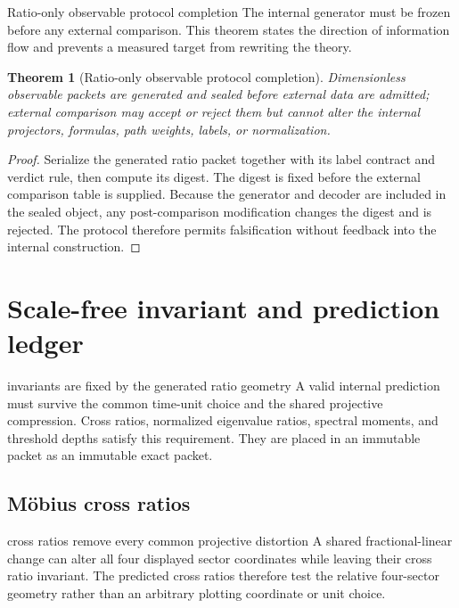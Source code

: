 \documentclass[11pt]{article}
\numberwithin{equation}{section}
\newtheorem{theorem}[definition]{Theorem}
\theoremstyle{remark}
\begin{document}
\begin{proofguide}{Ratio-only observable protocol completion}
The internal generator must be frozen before any external comparison. This theorem states the direction of information flow and prevents a measured target from rewriting the theory.
\end{proofguide}
\begin{theorem}[Ratio-only observable protocol completion]
Dimensionless observable packets are generated and sealed before external data are admitted; external comparison may accept or reject them but cannot alter the internal projectors, formulas, path weights, labels, or normalization.
\end{theorem}
\begin{proof}
Serialize the generated ratio packet together with its label contract and verdict rule, then compute its digest. The digest is fixed before the external comparison table is supplied. Because the generator and decoder are included in the sealed object, any post-comparison modification changes the digest and is rejected. The protocol therefore permits falsification without feedback into the internal construction.
\end{proof}

\section{Scale-free invariant and prediction ledger}
\begin{conceptledger}{invariants are fixed by the generated ratio geometry}
A valid internal prediction must survive the common time-unit choice and the shared projective compression. Cross ratios, normalized eigenvalue ratios, spectral moments, and threshold depths satisfy this requirement. They are placed in an immutable packet as an immutable exact packet.
\end{conceptledger}

\label{sec:predictions}

\subsection{M\"obius cross ratios}
\begin{interpretivebridge}{cross ratios remove every common projective distortion}
A shared fractional-linear change can alter all four displayed sector coordinates while leaving their cross ratio invariant. The predicted cross ratios therefore test the relative four-sector geometry rather than an arbitrary plotting coordinate or unit choice.
\end{interpretivebridge}
\end{document}

